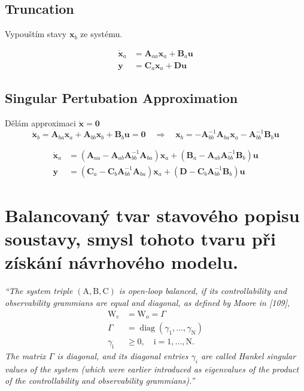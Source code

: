 \documentclass{article}
\begin{document}
	\subsection{Truncation}
	Vypouštím stavy $\bm{x}_b$ ze systému.

	\begin{align}
		\bm{\dot{x}}_a &= \bm{A}_{aa} \bm{x}_a + \bm{B}_a \bm{u} \\
		\bm{y} &= \bm{C}_a \bm{x}_a + \bm{D}\bm{u}
	\end{align}

	\subsection{Singular Pertubation Approximation}

	Dělám approximaci $\bm{\dot{x}} = \bm{0}$
	\begin{equation}
		\bm{\dot{x}}_b = \bm{A}_{ba}\bm{x}_a + \bm{A}_{bb}\bm{x}_b + \bm{B}_b\bm{u} = \bm{0}
		\quad \Rightarrow \quad
		\bm{x}_b = -\bm{A}_{bb}^{-1}\bm{A}_{ba} \bm{x}_a - \bm{A}_{bb}^{-1} \bm{B}_b \bm{u}
	\end{equation}

	\begin{align}
		\bm{\dot{x}}_a
		&=
		(\bm{A}_{aa} - \bm{A}_{ab} \bm{A}_{bb}^{-1} \bm{A}_{ba}) \bm{x}_a
		+ 
		(\bm{B}_a - \bm{A}_{ab} \bm{A}_{bb}^{-1} \bm{B}_b) \bm{u} \\
		\bm{y}
		&=
		(\bm{C}_a - \bm{C}_b \bm{A}_{bb}^{-1} \bm{A}_{ba}) \bm{x}_a
		+
		(\bm{D} - \bm{C}_b \bm{A}_{bb}^{-1} \bm{B}_b) \bm{u}
	\end{align}

	\section{Balancovaný tvar stavového popisu soustavy, smysl tohoto tvaru při získání návrhového modelu.}

	\emph{``The system triple $(\mathrm{A}, \mathrm{B}, \mathrm{C})$ is open-loop balanced, if its controllability and observability grammians are equal and diagonal, as defined by Moore in [109],
	$$
	\begin{aligned}
	\mathrm{W}_{\mathrm{c}} &=\mathrm{W}_{\mathrm{o}}=\Gamma \\
	\Gamma &=\operatorname{diag}\left(\gamma_{1}, \ldots, \gamma_{\mathrm{N}}\right) \\
	\gamma_{\mathrm{i}} & \geq 0, \quad \mathrm{i}=1, \ldots, \mathrm{N} .
	\end{aligned}
	$$
	The matrix $\Gamma$ is diagonal, and its diagonal entries $\gamma_{i}$ are called Hankel singular values of the system (which were earlier introduced as eigenvalues of the product of the controllability and observability grammians).''} 
\end{document}
